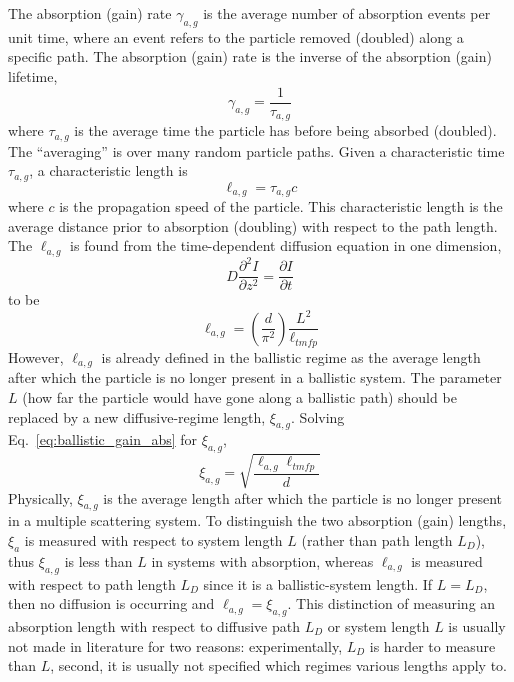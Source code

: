 The absorption (gain) rate $\gamma_{a,g}$ is the average number of absorption events per unit time, where an event refers to the particle removed (doubled) along a specific path. The absorption (gain) rate is the inverse of the absorption (gain) lifetime,
\begin{equation}
\gamma_{a,g} = \frac{1}{\tau_{a,g}}
\end{equation}
where $\tau_{a,g}$ is the average time the particle has before being absorbed (doubled). The ``averaging'' is over many random particle paths. Given a characteristic time $\tau_{a,g}$, a characteristic length is 
\begin{equation}
\ell_{a,g} = \tau_{a,g} c
\end{equation}
where $c$ is the propagation speed of the particle. This characteristic length is the average distance prior to absorption (doubling) with respect to the path length. The $\ell_{a,g}$ is found from the time-dependent diffusion equation in one dimension,
\begin{equation}
D \frac{\partial^2 I}{\partial z^2} = \frac{\partial I}{\partial t}
\label{eq:diffusion_equation_1D}
\end{equation}
to be 
\begin{equation}
\ell_{a,g}= \left( \frac{d}{\pi^2}\right) \frac{L^2}{\ell_{tmfp}}
\label{eq:ballistic_gain_abs}
\end{equation}
However, $\ell_{a,g}$ is already defined in the ballistic regime as the average length after which the particle is no longer present in a ballistic system. The parameter $L$ (how far the particle would have gone along a ballistic path) should be replaced by a new diffusive-regime length, $\xi_{a,g}$. Solving Eq.~\ref{eq:ballistic_gain_abs} for $\xi_{a,g}$,
\begin{equation}
 \xi_{a,g} = \sqrt{\frac{\ell_{a,g} \ell_{tmfp}}{d}}
\label{eq:diffusive_absorption_length}
\end{equation}
Physically, $\xi_{a,g}$ is the average length after which the particle is no longer present in a multiple scattering system. To distinguish the two absorption (gain) lengths, $\xi_a$ is measured with respect to system length $L$ (rather than path length $L_D$), thus $\xi_{a,g}$ is less than $L$ in systems with absorption, whereas $\ell_{a,g}$ is measured with respect to path length $L_D$ since it is a ballistic-system length. If $L=L_D$, then no diffusion is occurring and $\ell_{a,g} = \xi_{a,g}$.  This distinction of measuring an absorption length with respect to diffusive path $L_D$ or system length $L$ is usually not made in literature for two reasons: experimentally, $L_D$ is harder to measure than $L$, second, it is usually not specified which regimes various lengths apply to.

